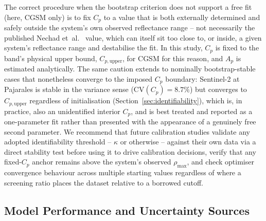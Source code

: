 \documentclass[remotesensing,article,submit,pdftex,moreauthors]{Definitions/mdpi}
\begin{document}
The correct procedure when the bootstrap criterion does not support a
free fit (here, CGSM only) is to fix $C_p$ to a value that is both
externally determined and safely outside the system's own observed
reflectance range -- not necessarily the published Nechad
et~al.\ \citeyearpar{NECHAD2010854} value, which can itself sit too
close to, or inside, a given system's reflectance range and destabilise
the fit. In this study, $C_p$ is fixed to the band's physical upper
bound, $C_{p,\text{upper}}$, for CGSM for this reason, and $A_p$ is
estimated analytically. The same caution extends to nominally
bootstrap-stable cases that nonetheless converge to the imposed $C_p$
boundary: Sentinel-2 at Pajarales is stable in the variance sense
($\mathrm{CV}(C_p) = 8.7\%$) but converges to $C_{p,\text{upper}}$
regardless of initialisation
(Section~\ref{sec:identifiability}), which is, in practice, also an
unidentified interior $C_p$, and is best treated and reported as a
one-parameter fit rather than presented with the appearance of a
genuinely free second parameter. We recommend that future calibration
studies validate any adopted identifiability threshold -- $\kappa$ or
otherwise -- against their own data via a direct stability test before
using it to drive calibration decisions, verify that any fixed-$C_p$
anchor remains above the system's observed $\rho_{\max}$, and check
optimiser convergence behaviour across multiple starting values
regardless of where a screening ratio places the dataset relative to a
borrowed cutoff.
 
 
\subsection{Model Performance and Uncertainty Sources}
\label{sec:disc_performance}
 
\end{document}
